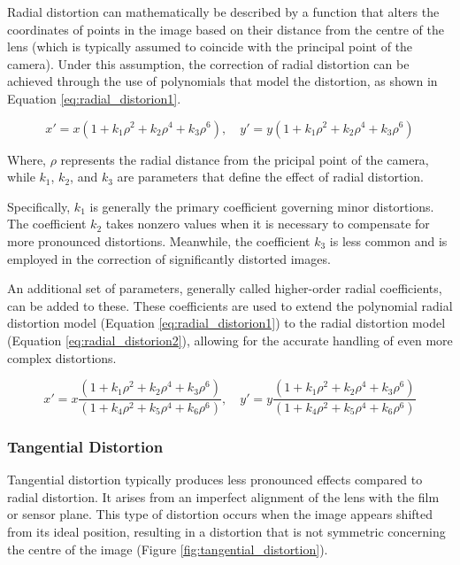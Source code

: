 Radial distortion can mathematically be described by a function that alters the coordinates of points in the image based on their distance from the centre of the lens (which is typically assumed to coincide with the principal point of the camera).
Under this assumption, the correction of radial distortion can be achieved through the use of polynomials that model the distortion, as shown in Equation \ref{eq:radial_distorion1}. 

\begin{equation}
  x' = x ( 1 + k_1 \rho^2 + k_2 \rho^4 + k_3 \rho^6 ), 
  \quad
  y' = y ( 1 + k_1 \rho^2 + k_2 \rho^4 + k_3 \rho^6)
  \label{eq:radial_distorion1}
\end{equation}

Where, $\rho$ represents the radial distance from the pricipal point of the camera, while $k_1$, $k_2$, and $k_3$ are parameters that define the effect of radial distortion.

Specifically, $k_1$ is generally the primary coefficient governing minor distortions. The coefficient $k_2$ takes nonzero values when it is necessary to compensate for more pronounced distortions. Meanwhile, the coefficient $k_3$ is less common and is employed in the correction of significantly distorted images.

An additional set of parameters, generally called higher-order radial coefficients, can be added to these. These coefficients are used to extend the polynomial radial distortion model (Equation \ref{eq:radial_distorion1}) to the radial distortion model (Equation \ref{eq:radial_distorion2}), allowing for the accurate handling of even more complex distortions.

\begin{equation}
  x' = x \frac{( 1 + k_1 \rho^2 + k_2 \rho^4 + k_3 \rho^6 )}
  {( 1 + k_4 \rho^2 + k_5 \rho^4 + k_6 \rho^6 )}, 
  \quad
  y' = y\frac{( 1 + k_1 \rho^2 + k_2 \rho^4 + k_3 \rho^6 )}
  {( 1 + k_4 \rho^2 + k_5 \rho^4 + k_6 \rho^6 )}
  \label{eq:radial_distorion2}
\end{equation}

\subsubsection{Tangential Distortion}

Tangential distortion typically produces less pronounced effects compared to radial distortion.
It arises from an imperfect alignment of the lens with the film or sensor plane. This type of distortion occurs when the image appears shifted from its ideal position, resulting in a distortion that is not symmetric concerning the centre of the image (Figure \ref{fig:tangential_distortion}).

